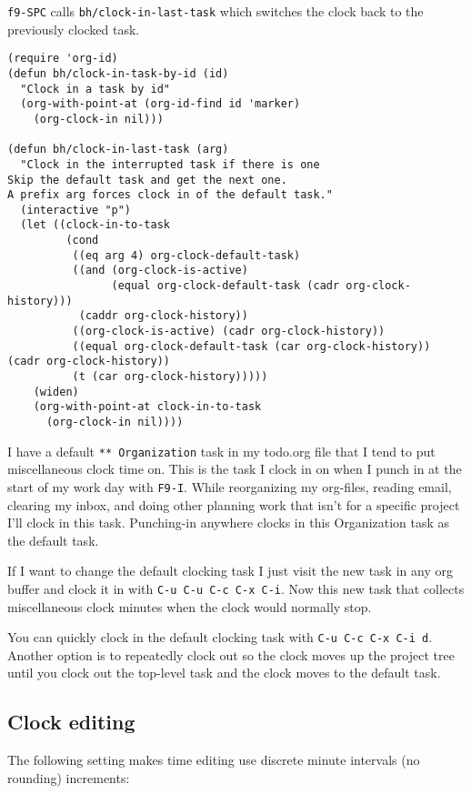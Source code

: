\documentclass[11pt]{scrartcl}
\begin{document}
\texttt{f9-SPC} calls \texttt{bh/clock-in-last-task} which switches the clock back
to the previously clocked task.

\begin{verbatim}
(require 'org-id)
(defun bh/clock-in-task-by-id (id)
  "Clock in a task by id"
  (org-with-point-at (org-id-find id 'marker)
    (org-clock-in nil)))

(defun bh/clock-in-last-task (arg)
  "Clock in the interrupted task if there is one
Skip the default task and get the next one.
A prefix arg forces clock in of the default task."
  (interactive "p")
  (let ((clock-in-to-task
         (cond
          ((eq arg 4) org-clock-default-task)
          ((and (org-clock-is-active)
                (equal org-clock-default-task (cadr org-clock-history)))
           (caddr org-clock-history))
          ((org-clock-is-active) (cadr org-clock-history))
          ((equal org-clock-default-task (car org-clock-history)) (cadr org-clock-history))
          (t (car org-clock-history)))))
    (widen)
    (org-with-point-at clock-in-to-task
      (org-clock-in nil))))
\end{verbatim}

I have a default \texttt{** Organization} task in my todo.org file that
I tend to put miscellaneous clock time on.  This is the task I
clock in on when I punch in at the start of my work day with
\texttt{F9-I}.  While reorganizing my org-files, reading email,
clearing my inbox, and doing other planning work that isn't for
a specific project I'll clock in this task.  Punching-in
anywhere clocks in this Organization task as the default task.

If I want to change the default clocking task I just visit the
new task in any org buffer and clock it in with \texttt{C-u C-u C-c C-x
C-i}.  Now this new task that collects miscellaneous clock
minutes when the clock would normally stop.

You can quickly clock in the default clocking task with \texttt{C-u C-c
C-x C-i d}.  Another option is to repeatedly clock out so the
clock moves up the project tree until you clock out the
top-level task and the clock moves to the default task.
\subsection{Clock editing}
\label{sec:orgheadline23}

The following setting makes time editing use discrete minute intervals (no rounding)
increments:
\end{document}
